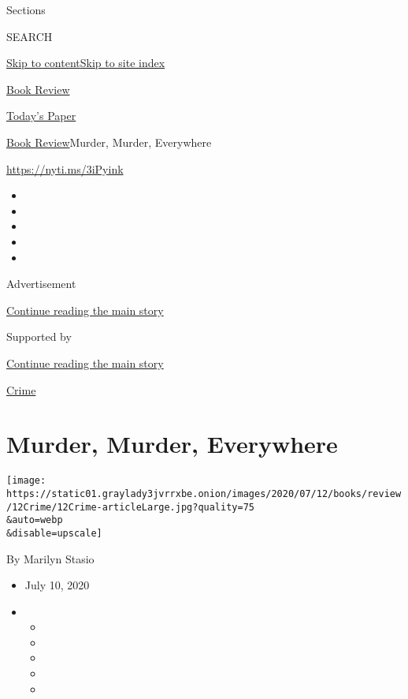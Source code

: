 Sections

SEARCH

\protect\hyperlink{site-content}{Skip to
content}\protect\hyperlink{site-index}{Skip to site index}

\href{https://www.nytimes3xbfgragh.onion/section/books/review}{Book
Review}

\href{https://myaccount.nytimes3xbfgragh.onion/auth/login?response_type=cookie\&client_id=vi}{}

\href{https://www.nytimes3xbfgragh.onion/section/todayspaper}{Today's
Paper}

\href{/section/books/review}{Book Review}\textbar{}Murder, Murder,
Everywhere

\url{https://nyti.ms/3iPyink}

\begin{itemize}
\item
\item
\item
\item
\item
\end{itemize}

Advertisement

\protect\hyperlink{after-top}{Continue reading the main story}

Supported by

\protect\hyperlink{after-sponsor}{Continue reading the main story}

\href{/column/crime}{Crime}

\hypertarget{murder-murder-everywhere}{%
\section{Murder, Murder, Everywhere}\label{murder-murder-everywhere}}

\texttt{[image: https://static01.graylady3jvrrxbe.onion/images/2020/07/12/books/review/12Crime/12Crime-articleLarge.jpg?quality=75\\\&auto=webp\\\&disable=upscale]}

By Marilyn Stasio

\begin{itemize}
\item
  July 10, 2020
\item
  \begin{itemize}
  \item
  \item
  \item
  \item
  \item
  \end{itemize}
\end{itemize}

